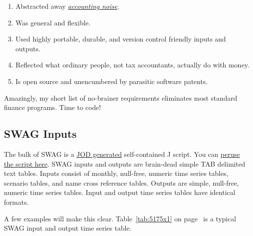 \begin{enumerate}
\tightlist
\item
  Abstracted away \href{http://www.investopedia.com/terms/a/accountingnoise.asp}{\emph{accounting noise}}.
\item
  Was general and flexible.
\item
  Used highly portable, durable, and version control friendly inputs and
  outputs.
\item
  Reflected what ordinary people, not tax accountants, actually do with
  money.
\item
  Is open source and unencumbered by parasitic software patents.
\end{enumerate}

Amazingly, my short list of no-brainer requirements eliminates most
standard finance programs. Time to code!

\subsection*{SWAG Inputs}%

The bulk of SWAG is a
\href{http://code.jsoftware.com/wiki/Addons/general/jod}{JOD generated}
self-contained J script. You can
\href{https://github.com/bakerjd99/jacks/blob/master/swag/scripts/Swag.ijs}{peruse
the script here}. SWAG inputs and outputs are brain-dead simple TAB
delimited text tables. Inputs consist of monthly, null-free, numeric
time series tables, scenario tables, and name cross reference tables.
Outputs are simple, null-free, numeric time series tables. Input and
output time series tables have identical formats.

A few examples will make this clear. Table~\ref{tab:5175x1} on page~\pageref{tab:5175x1} is a typical SWAG
input and output time series table.


